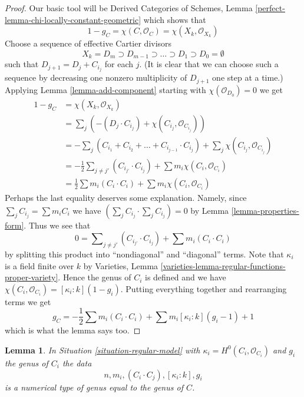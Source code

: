 \documentclass{stacks-project}
\theoremstyle{plain}
\newtheorem{lemma}[subsection]{Lemma}
\theoremstyle{definition}
\theoremstyle{remark}
\numberwithin{equation}{subsection}
\begin{document}
\begin{proof}
Our basic tool will be Derived Categories of Schemes, Lemma
\ref{perfect-lemma-chi-locally-constant-geometric}
which shows that
$$
1 - g_C = \chi(C, \mathcal{O}_C) =
\chi(X_k, \mathcal{O}_{X_k})
$$
Choose a sequence of effective Cartier divisors
$$
X_k = D_m \supset D_{m - 1} \supset \ldots \supset D_1 \supset D_0 = \emptyset
$$
such that $D_{j + 1} = D_j + C_{i_j}$ for each $j$. (It is clear that
we can choose such a sequence by decreasing one nonzero multiplicity
of $D_{j + 1}$ one step at a time.) Applying Lemma \ref{lemma-add-component}
starting with $\chi(\mathcal{O}_{D_0}) = 0$ we get
\begin{align*}
1 - g_C
& =
\chi(X_k, \mathcal{O}_{X_k}) \\
& =
\sum\nolimits_j
\left(-(D_j \cdot C_{i_j}) +  \chi(C_{i_j}, \mathcal{O}_{C_{i_j}})\right) \\
& =
- \sum\nolimits_j
(C_{i_1} + C_{i_2} + \ldots + C_{i_{j - 1}} \cdot C_{i_j}) +
\sum\nolimits_j \chi(C_{i_j}, \mathcal{O}_{C_{i_j}}) \\
& =
-\frac{1}{2}\sum\nolimits_{j \not = j'} (C_{i_{j'}} \cdot C_{i_j}) +
\sum m_i \chi(C_i, \mathcal{O}_{C_i}) \\
& =
\frac{1}{2} \sum m_i(C_i \cdot C_i) + \sum m_i \chi(C_i, \mathcal{O}_{C_i})
\end{align*}
Perhaps the last equality deserves some explanation. Namely, since
$\sum_j C_{i_j} = \sum m_i C_i$ we have
$(\sum_j C_{i_j} \cdot \sum_j C_{i_j}) = 0$ by
Lemma \ref{lemma-properties-form}. Thus we see that
$$
0 = \sum\nolimits_{j \not = j'} (C_{i_{j'}} \cdot C_{i_j}) +
\sum m_i(C_i \cdot C_i)
$$
by splitting this product into ``nondiagonal'' and ``diagonal'' terms.
Note that $\kappa_i$ is a field finite over $k$ by
Varieties, Lemma \ref{varieties-lemma-regular-functions-proper-variety}.
Hence the genus of $C_i$ is defined and we have
$\chi(C_i, \mathcal{O}_{C_i}) = [\kappa_i : k](1 - g_i)$.
Putting everything together and rearranging terms we get
$$
g_C = - \frac{1}{2}\sum m_i(C_i \cdot C_i) +
\sum m_i[\kappa_i : k](g_i - 1) + 1
$$
which is what the lemma says too.
\end{proof}

\begin{lemma}
\label{lemma-numerical-type-of-model}
In Situation \ref{situation-regular-model} with
$\kappa_i = H^0(C_i, \mathcal{O}_{C_i})$ and $g_i$ the genus of $C_i$
the data
$$
n, m_i, (C_i \cdot C_j), [\kappa_i : k], g_i
$$
is a numerical type of genus equal to the genus of $C$.
\end{lemma}
\end{document}
